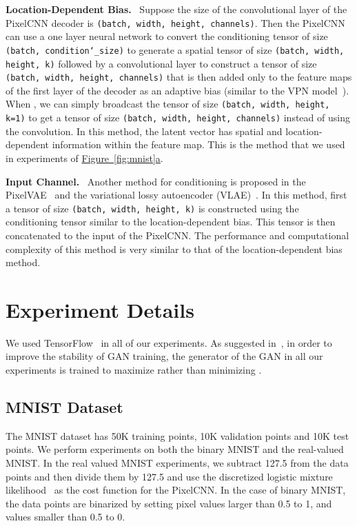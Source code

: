 \documentclass{article}
\newcommand{\myfigg}[2]{\hyperref[fig:#1]{Figure~\ref*{fig:#1}#2}}
\DeclareRobustCommand{\parhead}[1]{\textbf{#1}~}
\begin{document}
\begin{appendices}
\parhead{Location-Dependent Bias.} Suppose the size of the convolutional layer of the PixelCNN decoder is \texttt{(batch, width, height, channels)}. Then the PixelCNN can use a one layer neural network to convert the conditioning tensor of size \texttt{(batch, condition\char`_size)} to generate a spatial tensor of size \texttt{(batch, width, height, k)} followed by a  convolutional layer to construct a tensor of size \texttt{(batch, width, height, channels)} that is then added only to the feature maps of the first layer of the decoder as an adaptive bias (similar to the VPN model~\citep{vpn}). When , we can simply broadcast the tensor of size \texttt{(batch, width, height, k=1)} to get a tensor of size \texttt{(batch, width, height, channels)} instead of using the  convolution. In this method, the latent vector has spatial and location-dependent information within the feature map. This is the method that we used in experiments of \myfigg{mnist}{a}.

\parhead{Input Channel.} Another method for conditioning is proposed in the PixelVAE~\citep{pixelvae} and the variational lossy autoencoder (VLAE)~\citep{vlae}. In this method, first a tensor of size \texttt{(batch, width, height, k)} is constructed using the conditioning tensor similar to the location-dependent bias. This tensor is then concatenated to the input of the PixelCNN. The performance and computational complexity of this method is very similar to that of the location-dependent bias method.



\section{Experiment Details}\label{appendix:experiment}
We used TensorFlow~\citep{tensorflow2015-whitepaper} in all of our experiments. As suggested in~\citep{gan}, in order to improve the stability of GAN training, the generator of the GAN in all our experiments is trained to maximize  rather than minimizing .
\subsection{MNIST Dataset}\label{appendix:mnist}
The MNIST dataset has 50K training points, 10K validation points and 10K test points. We perform experiments on both the binary MNIST and the real-valued MNIST. In the real valued MNIST experiments, we subtract 127.5 from the data points and then divide them by 127.5 and use the discretized logistic mixture likelihood~\citep{pixelcnn++} as the cost function for the PixelCNN. In the case of binary MNIST, the data points are binarized by setting pixel values larger than 0.5 to 1, and values smaller than 0.5 to 0.


\end{appendices}
\end{document}
